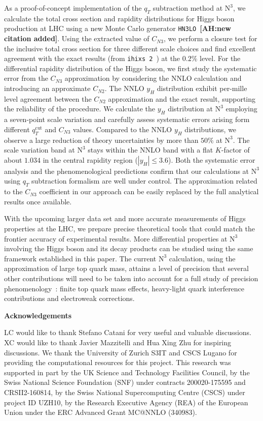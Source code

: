 \documentclass[12pt]{article}
\DeclareRobustCommand{\AH}[1]{\textbf{\quad\color{purple}[AH:\quad #1]}\xspace}
\DeclareRobustCommand{\qt}{\ensuremath{q_T}\xspace}
\DeclareRobustCommand{\qtcut}{\ensuremath{q_T^\mathrm{cut}}\xspace}
\DeclareRobustCommand{\LO}{\text{LO}\xspace}
\DeclareRobustCommand{\N}[1]{\ensuremath{\text{N}^{#1}}} %
\begin{document}
As a proof-of-concept implementation of the $\qt$ subtraction method at \N3\LO,  we calculate the total cross section and rapidity distributions for Higgs boson production at LHC using a new Monte Carlo generator \texttt{HN3LO}~\cite{leaninprepHN3LO}\AH{new citation added}. Using the extracted value of $C_{N3}$, we perform a closure test for the inclusive total cross section for three different scale choices and find excellent agreement with the exact results (from \texttt{ihixs 2}~\cite{Dulat:2018rbf}) at the $0.2\%$ level. For the differential rapidity distribution of the Higgs boson, we first study the systematic error from the $C_{N3}$ approximation by considering the NNLO calculation and introducing an approximate $C_{N2}$. The NNLO $y_H$ distribution exhibit per-mille level agreement between the $C_{N2}$ approximation and the exact result, supporting the reliability of the procedure. 
We calculate the $y_H$ distribution at \N3\LO employing a seven-point scale variation and carefully assess systematic errors arising form different $\qtcut$ and $C_{N3}$ values. Compared to the NNLO $y_H$ distributions, we observe a large reduction of theory uncertainties by more than $50\%$ at \N3\LO. The scale variation band at \N3\LO stays within the NNLO band with a flat $K$-factor of about $1.034$ in the central rapidity region ($|y_H|\leq3.6$). Both the systematic error analysis and the phenomenological predictions confirm that our calculations at \N3\LO using $\qt$ subtraction formalism are well under control. The approximation related to the $C_{N3}$ coefficient in our approach can be easily replaced by the full analytical results once available. 

With the upcoming larger data set and more accurate measurements of Higgs properties at the LHC, we prepare precise theoretical tools that could match the frontier accuracy of experimental results. More differential properties at \N3\LO involving the Higgs boson and its decay products can be studied using the same framework established in this paper. The current \N3\LO calculation, using the approximation of large top quark mass, attains a level of  precision that several 
other contributions will need to be taken into account for a full study of precision phenomenology~\cite{Anastasiou:2016cez}: finite top quark mass effects, heavy-light quark interference contributions  
and electroweak corrections. 


\bigskip\noindent\textbf{Acknowledgements}

LC would like to thank Stefano Catani for very useful and valuable discussions. XC would like to thank Javier Mazzitelli and Hua Xing Zhu for inspiring discussions. We thank the University of Zurich S3IT and CSCS Lugano for providing the computational resources for this project. This research was supported in part by the UK Science and Technology Facilities Council, by the Swiss National Science Foundation (SNF) under contracts 200020-175595 and CRSII2-160814, by the Swiss National Supercomputing Centre (CSCS) under project ID UZH10, by the Research Executive Agency (REA) of the European Union under the ERC Advanced Grant MC@NNLO (340983).
\end{document}
